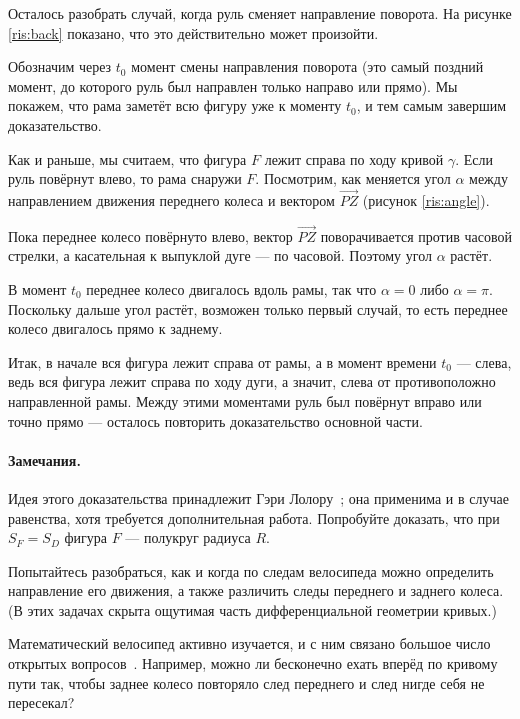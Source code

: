 \documentclass[a4paper,10pt]{article}
\begin{document}
Осталось разобрать случай, когда руль сменяет направление поворота.
На рисунке \ref{ris:back} показано, что это действительно может произойти.

Обозначим через $t_0$ момент смены направления поворота (это самый поздний момент, до которого руль был направлен только направо или прямо).
Мы покажем, что рама заметёт всю фигуру уже к моменту $t_0$, и тем самым завершим доказательство.

Как и раньше, мы считаем, что фигура $F$ лежит справа по ходу кривой $\gamma$.
Если руль повёрнут влево, то рама снаружи $F$.
Посмотрим, как меняется угол $\alpha$ между направлением движения переднего колеса и вектором $\overrightarrow{PZ}$ (рисунок \ref{ris:angle}).

Пока переднее колесо повёрнуто влево, вектор $\overrightarrow{PZ}$
поворачивается против часовой стрелки, а касательная к выпуклой дуге --- по часовой.
Поэтому угол $\alpha$ растёт.

В момент $t_0$ переднее колесо двигалось вдоль рамы,
так что $\alpha=0$ либо $\alpha=\pi$.
Поскольку дальше угол растёт, возможен только первый случай,
то есть переднее колесо двигалось прямо к заднему.

Итак, в начале вся фигура лежит справа от рамы, а в момент времени $t_0$ --- слева, ведь вся фигура лежит справа по ходу дуги, а значит, слева от противоположно направленной рамы.
Между этими моментами руль был повёрнут вправо или точно прямо --- осталось повторить доказательство основной части.


\paragraph{Замечания.}
Идея этого доказательства принадлежит Гэри Лолору~\cite{lawlor};
она применима и в случае равенства, хотя требуется дополнительная работа.
Попробуйте доказать, что при $S_F=S_D$ фигура $F$ --- полукруг радиуса $R$.

Попытайтесь разобраться, как и когда по следам велосипеда можно определить направление его движения, а также различить следы переднего и заднего колеса.
(В этих задачах скрыта ощутимая часть дифференциальной геометрии кривых.)

Математический велосипед активно изучается, и с ним связано большое число открытых вопросов~\cite{foote-levi-tabachnikov,levi-tabachnikov,wagon}.
Например, можно ли бесконечно ехать вперёд по кривому пути так, чтобы заднее колесо повторяло след переднего и след нигде себя не пересекал?


{\sloppy\printbibliography[heading=bibintoc]\fussy}
\end{document}
